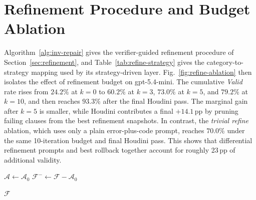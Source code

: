 \section{Refinement Procedure and Budget Ablation}
\label{app:refine-ablation}

Algorithm~\ref{alg:inv-repair} gives the verifier-guided refinement procedure of Section~\ref{sec:refinement}, and Table~\ref{tab:refine-strategy} gives the category-to-strategy mapping used by its strategy-driven layer. Fig.~\ref{fig:refine-ablation} then isolates the effect of refinement budget on gpt-5.4-mini. The cumulative \emph{Valid} rate rises from \(24.2\%\) at \(k{=}0\) to \(60.2\%\) at \(k{=}3\), \(73.0\%\) at \(k{=}5\), and \(79.2\%\) at \(k{=}10\), and then reaches \(93.3\%\) after the final Houdini pass. The marginal gain after \(k{=}5\) is smaller, while Houdini contributes a final \(+14.1\)\,pp by pruning failing clauses from the best refinement snapshots. In contrast, the \emph{trivial refine} ablation, which uses only a plain error-plus-code prompt, reaches \(70.0\%\) under the same 10-iteration budget and final Houdini pass. This shows that differential refinement prompts and best rollback together account for roughly 23\,pp of additional validity.

\begin{algorithm}[t]
\caption{Verifier-Guided Refinement $\mathrm{Refine}$}
\label{alg:inv-repair}
\small
{}

$\mathcal{A} \gets \mathcal{A}_{0}$\;
$\mathcal{F}^{-} \gets \mathcal{F} - \mathcal{A}_{0}$\;


\Return $\mathcal{F}$\;
\end{algorithm}

